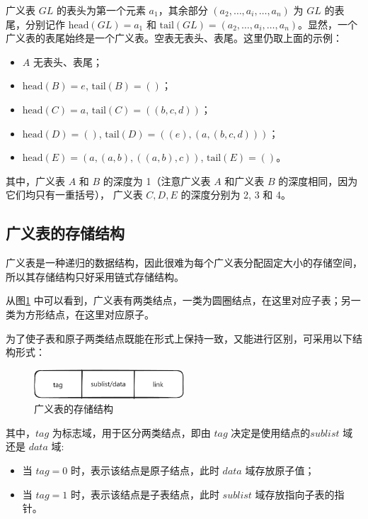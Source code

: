 \documentclass[lang=cn,newtx,10pt,scheme=chinese]{../elegantbook}
\begin{document}
广义表 $GL$ 的表头为第一个元素 $a_1$，其余部分 $(a_2, \dots, a_i, \dots, a_n)$ 为 $GL$ 的表尾，分别记作 $\text{head}(GL) = a_1$ 和 $\text{tail}(GL) = (a_2, \dots, a_i, \dots, a_n)$。显然，一个广义表的表尾始终是一个广义表。空表无表头、表尾。这里仍取上面的示例：

\begin{itemize}
  \item $A$ 无表头、表尾；
  \item $\text{head}(B) = e$, $\text{tail}(B) = ()$；
  \item $\text{head}(C) = a$, $\text{tail}(C) = ((b, c, d))$；
  \item $\text{head}(D) = ()$, $\text{tail}(D) = ((e), (a, (b, c, d)))$；
  \item $\text{head}(E) = (a,(a,b),((a,b),c))$, $\text{tail}(E) = ()$。
\end{itemize}

其中，广义表 $A$ 和 $B$ 的深度为 1（注意广义表 $A$ 和广义表 $B$ 的深度相同，因为它们均只有一重括号），
广义表 $C, D, E$ 的深度分别为 2, 3 和 4。

\subsection{广义表的存储结构}

广义表是一种递归的数据结构，因此很难为每个广义表分配固定大小的存储空间，所以其存储结构只好采用链式存储结构。

从图\ref{fig:generalized_table_node} 中可以看到，广义表有两类结点，一类为圆圈结点，在这里对应子表；另一类为方形结点，在这里对应原子。

为了使子表和原子两类结点既能在形式上保持一致，又能进行区别，可采用以下结构形式：

\begin{figure}[h]
  \centering
  \includegraphics[width=0.5\textwidth]{./figure/pdf/cropped/GLStruct.pdf}
  \caption{广义表的存储结构}
  \label{fig:generalized_table_node}
\end{figure}

其中，$tag$ 为标志域，用于区分两类结点，即由 $tag$ 决定是使用结点的$sublist$ 域还是 $data$ 域:

\begin{itemize}
  \item 当 $tag = 0$ 时，表示该结点是原子结点，此时 $data$ 域存放原子值；
  \item 当 $tag = 1$ 时，表示该结点是子表结点，此时 $sublist$ 域存放指向子表的指针。
  \end{itemize}
\end{document}
